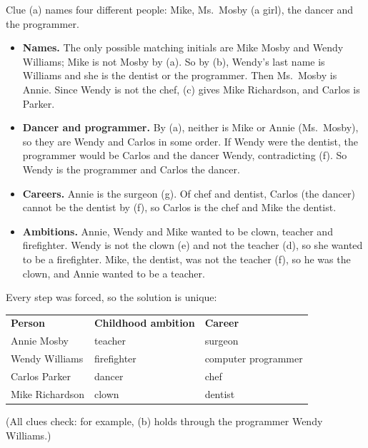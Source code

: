 Clue (a) names four different people: Mike, Ms.\ Mosby (a girl), the dancer and the programmer.
\begin{itemize}
\item \textbf{Names.} The only possible matching initials are Mike Mosby and Wendy Williams; Mike is not Mosby by (a). So by (b), Wendy's last name is Williams and she is the dentist or the programmer. Then Ms.\ Mosby is Annie. Since Wendy is not the chef, (c) gives Mike Richardson, and Carlos is Parker.
\item \textbf{Dancer and programmer.} By (a), neither is Mike or Annie (Ms.\ Mosby), so they are Wendy and Carlos in some order. If Wendy were the dentist, the programmer would be Carlos and the dancer Wendy, contradicting (f). So Wendy is the programmer and Carlos the dancer.
\item \textbf{Careers.} Annie is the surgeon (g). Of chef and dentist, Carlos (the dancer) cannot be the dentist by (f), so Carlos is the chef and Mike the dentist.
\item \textbf{Ambitions.} Annie, Wendy and Mike wanted to be clown, teacher and firefighter. Wendy is not the clown (e) and not the teacher (d), so she wanted to be a firefighter. Mike, the dentist, was not the teacher (f), so he was the clown, and Annie wanted to be a teacher.
\end{itemize}
Every step was forced, so the solution is unique:
\begin{center}
\begin{tabular}{lll}
\textbf{Person} & \textbf{Childhood ambition} & \textbf{Career}\\
Annie Mosby & teacher & surgeon\\
Wendy Williams & firefighter & computer programmer\\
Carlos Parker & dancer & chef\\
Mike Richardson & clown & dentist
\end{tabular}
\end{center}
(All clues check: for example, (b) holds through the programmer Wendy Williams.)
